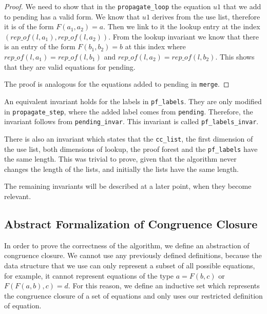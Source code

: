 \begin{proof}
We need to show that in the \lstinline{propagate_loop} the equation $u1$ that we add to pending has a valid form. We know that $u1$ derives from the use list, therefore it is of the form $F(a_1, a_2) = a$. Then we link to it the lookup entry at the index $(rep\_of(l, a_1), rep\_of(l, a_2))$. From the lookup invariant we know that there is an entry of the form $F(b_1, b_2) = b$ at this index where $rep\_of(l, a_1) = rep\_of(l, b_1)$ and $rep\_of(l, a_2) = rep\_of(l, b_2)$. This shows that they are valid equations for pending.

The proof is analogous for the equations added to pending in \lstinline{merge}.
\end{proof}

An equivalent invariant holds for the labels in \lstinline|pf_labels|. They are only modified in \lstinline|propagate_step|, where the added label comes from \lstinline|pending|.
Therefore, the invariant follows from \lstinline|pending_invar|. This invariant is called \lstinline|pf_labels_invar|.

There is also an invariant which states that the \lstinline{cc_list}, the first dimension of the use list, both dimensions of lookup, the proof forest and the \lstinline{pf_labels} have the same length. This was trivial to prove, given that the algorithm never changes the length of the lists, and initially the lists have the same length.

The remaining invariants will be described at a later point, when they become relevant.

\subsection{Abstract Formalization of Congruence Closure}
\label{subsection:abstraction}

In order to prove the correctness of the algorithm, we define an abstraction of congruence closure. We cannot use any previously defined definitions, because the data structure that we use can only represent a subset of all possible equations, for example, it cannot represent equations of the type $a = F(b, c)$ or $F (F (a, b), c) = d$. For this reason, we define an inductive set which represents the congruence closure of a set of equations and only uses our restricted definition of equation.

